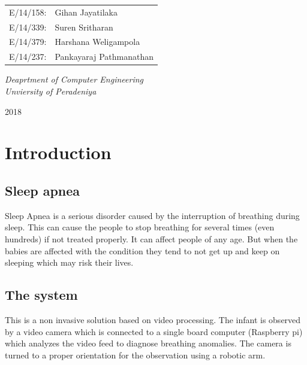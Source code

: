 \documentclass{article}
\begin{document}
\begin{titlepage}
	{\scshape\Large \begin{tabular}{c l}
	     E/14/158: &Gihan Jayatilaka\\E/14/339: &Suren Sritharan\\E/14/379:& Harshana Weligampola\\E/14/237: &Pankayaraj Pathmanathan\\
	\end{tabular} } %
	
	\vspace{0.5\baselineskip} %
	
	\textit{Deaprtment of Computer Engineering \\ Unviersity of Peradeniya} %
	
	\vfill %
	
	
	
	\vspace{0.3\baselineskip} %
	
	2018 %
	
\end{titlepage}

\tableofcontents
\listoffigures
\clearpage
\section{Introduction}
\subsection{Sleep apnea}
Sleep Apnea is a serious disorder caused by the interruption of breathing during sleep. This can cause the people to stop breathing for several times (even hundreds) if not treated properly. It can affect people of any age. But when the babies are affected with the condition they tend to not get up and keep on sleeping which may risk their lives.

\subsection{The system}
This is a non invasive solution based on video processing. The infant is observed by a video camera which is connected to a single board computer (Raspberry pi) which analyzes the video feed to diagnose breathing anomalies. The camera is turned to a proper orientation for the observation using a robotic arm.
\end{document}
